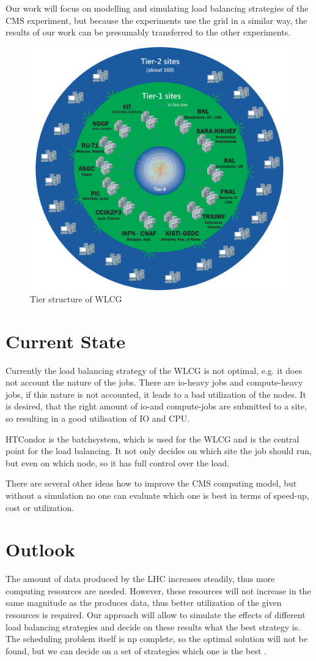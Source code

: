 Our work will focus on modelling and simulating load balancing strategies of the CMS experiment, but because the experiments use the grid in a similar way, the results of our work can be presumably transferred to the other experiments.

	\begin{figure}
		\centering
		\includegraphics[width=0.6\linewidth]{images/WLCG}
		\caption[]{Tier structure of WLCG \cite{wlcg_tiers}}
		\label{fig:wlcg}
	\end{figure}
	

\section{Current State}
Currently the load balancing strategy of the WLCG is not optimal, e.g. it does not account the nature of the jobs. There are io-heavy jobs and compute-heavy jobs, if this nature is not accounted, it leads to a bad utilization of the nodes. It is desired, that the right amount of io-and compute-jobs are submitted to a site, so resulting in a good utilisation of IO and CPU. 

HTCondor is the batchsystem, which is used for the WLCG and is the central point for the load balancing.
It not only decides on which site the job should run, but even on which node, so it has full control over the load.

There are several other ideas how to improve the CMS computing model, but without a simulation no one can evaluate which one is best in terms of speed-up, cost or utilization.


\section{Outlook}
The amount of data produced by the LHC increases steadily, thus more computing resources are needed.
However, these resources will not increase in the same magnitude as the produces data, thus better utilization of the given resources is required. Our approach will allow to simulate the effects of different load balancing strategies and decide on these results what the best strategy is. The scheduling problem itself is np complete, so the optimal solution will not be found, but we can decide on a set of strategies which one is the best \cite{1698650}.

